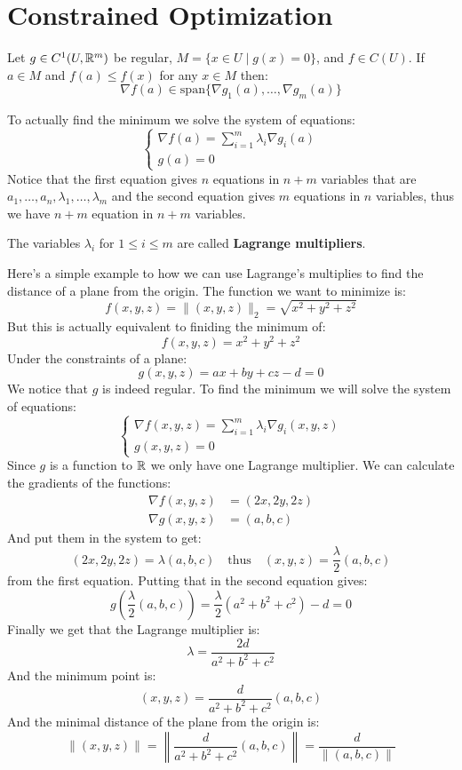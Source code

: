 \documentclass[11pt,a4paper]{article}
\begin{document}
\newpage

\section{Constrained Optimization}
\begin{proposition}
  Let $g \in C^1(U,\mathbb{R}^m)$ be regular,
  $M = \{x \in U \mid g(x) = 0\}$, and $f \in C(U)$. If $a \in M$ and
  $f(a) \le f(x)$ for any $x \in M$ then:
  \[
    \nabla f(a) \in \mathrm{span}\{\nabla g_1(a),\dots,\nabla g_m(a)\}
  \]
\end{proposition}
\noindent
To actually find the minimum we solve the system of equations:
\[
  \begin{cases}
    \nabla f(a) = \sum_{i = 1}^{m}{\lambda_i \nabla g_i(a)} \\
    g(a) = 0
  \end{cases}
\]
Notice that the first equation gives $n$ equations in $n + m$ variables
that are $a_1,\dots,a_n,\lambda_1,\dots,\lambda_m$ and the second
equation gives $m$ equations in $n$ variables, thus we have $n + m$
equation in $n + m$ variables.
\begin{remark}
  The variables $\lambda_i$ for $1 \le i \le m$ are called
  \textbf{Lagrange multipliers}.
\end{remark}
Here's a simple example to how we can use Lagrange's multiplies to find
the distance of a plane from the origin. The function we want to minimize
is:
\[
  f(x,y,z) = \|(x,y,z)\|_2 = \sqrt{x^2 + y^2 + z^2}
\]
But this is actually equivalent to finiding the minimum of:
\[
  f(x,y,z) = x^2 + y^2 + z^2
\]
Under the constraints of a plane:
\[
  g(x,y,z) = ax + by + cz - d = 0
\]
We notice that $g$ is indeed regular. To find the minimum we will solve
the system of equations:
\[
  \begin{cases}
    \nabla f(x,y,z) = \sum_{i = 1}^{m}{\lambda_i \nabla g_i(x,y,z)} \\
    g(x,y,z) = 0
  \end{cases}
\]
Since $g$ is a function to $\mathbb{R}$ we only have one Lagrange multiplier.
We can calculate the gradients of the functions:
\begin{align*}
  \nabla f(x,y,z) &= (2x,2y,2z) \\
  \nabla g(x,y,z) &= (a,b,c)
\end{align*}
And put them in the system to get:
\[
  (2x,2y,2z) = \lambda (a,b,c) \quad\text{thus}\quad
  (x,y,z) = \frac{\lambda}{2} (a,b,c)
\]
from the first equation. Putting that in the second equation gives:
\[
  g\left(\frac{\lambda}{2} (a,b,c)\right) = 
  \frac{\lambda}{2}(a^2 + b^2 + c^2) - d = 0
\]
Finally we get that the Lagrange multiplier is:
\[
  \lambda = \frac{2d}{a^2 + b^2 + c^2}
\]
And the minimum point is:
\[
  (x,y,z) = \frac{d}{a^2 + b^2 + c^2} (a,b,c)
\]
And the minimal distance of the plane from the origin is:
\[
  \|(x,y,z)\| = \left\|\frac{d}{a^2 + b^2 + c^2} (a,b,c)\right\| = 
  \frac{d}{\|(a,b,c)\|}
\]
\end{document}
